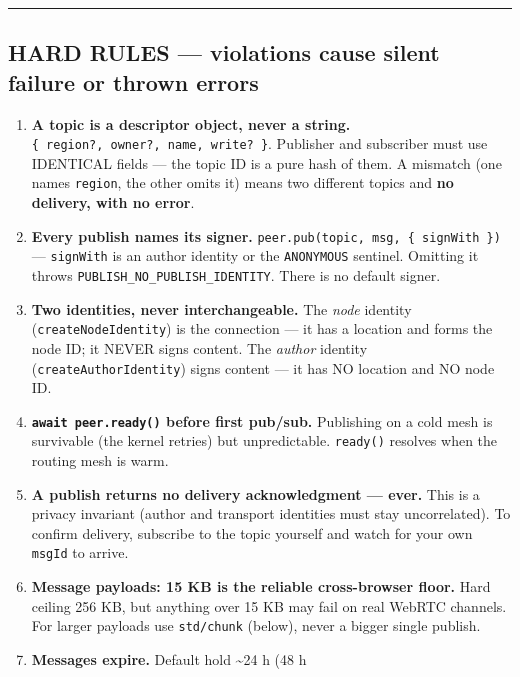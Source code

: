 \documentclass[
  nobib]{tufte-handout}
\providecommand{\tightlist}{%
  \setlength{\itemsep}{0pt}\setlength{\parskip}{0pt}}
\begin{document}
\begin{center}\rule{0.5\linewidth}{0.5pt}\end{center}

\subsection{HARD RULES --- violations cause silent failure or thrown
errors}\label{hard-rules-violations-cause-silent-failure-or-thrown-errors}

\begin{enumerate}
\def\labelenumi{\arabic{enumi}.}
\tightlist
\item
  \textbf{A topic is a descriptor object, never a string.}
  \texttt{\{\ region?,\ owner?,\ name,\ write?\ \}}. Publisher and
  subscriber must use IDENTICAL fields --- the topic ID is a pure hash
  of them. A mismatch (one names \texttt{region}, the other omits it)
  means two different topics and \textbf{no delivery, with no error}.
\item
  \textbf{Every publish names its signer.}
  \texttt{peer.pub(topic,\ msg,\ \{\ signWith\ \})} ---
  \texttt{signWith} is an author identity or the \texttt{ANONYMOUS}
  sentinel. Omitting it throws \texttt{PUBLISH\_NO\_PUBLISH\_IDENTITY}.
  There is no default signer.
\item
  \textbf{Two identities, never interchangeable.} The \emph{node}
  identity (\texttt{createNodeIdentity}) is the connection --- it has a
  location and forms the node ID; it NEVER signs content. The
  \emph{author} identity (\texttt{createAuthorIdentity}) signs content
  --- it has NO location and NO node ID.
\item
  \textbf{\texttt{await\ peer.ready()} before first pub/sub.} Publishing
  on a cold mesh is survivable (the kernel retries) but unpredictable.
  \texttt{ready()} resolves when the routing mesh is warm.
\item
  \textbf{A publish returns no delivery acknowledgment --- ever.} This
  is a privacy invariant (author and transport identities must stay
  uncorrelated). To confirm delivery, subscribe to the topic yourself
  and watch for your own \texttt{msgId} to arrive.
\item
  \textbf{Message payloads: 15 KB is the reliable cross-browser floor.}
  Hard ceiling 256 KB, but anything over 15 KB may fail on real WebRTC
  channels. For larger payloads use \texttt{std/chunk} (below), never a
  bigger single publish.
\item
  \textbf{Messages expire.} Default hold \textasciitilde24 h (48 h

\end{enumerate}
\end{document}
